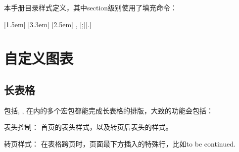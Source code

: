 本手册目录样式定义，其中section级别使用了填充命令：
\begin{latex}
[1.5em]{}{\contentslabel{1.5em}}
    {\hspace*{-2em}}{\hfill\contentspage}
[3.3em]{}
    {\contentslabel{1.8em}}{\hspace*{-2.3em}}
    {\titlerule*[8pt]{$\cdot$}\contentspage}
[2.5em]{\small}
    {\thecontentslabel{}}{}
    {, \thecontentspage}[;\qquad][.]
\end{latex}

\section{自定义图表}
\label{sec:figtab}
\subsection{长表格}
包括, , 在内的多个宏包都能完成长表格的排版，大致的功能会包括：
\begin{para}
\item[表头控制：] 首页的表头样式，以及转页后表头的样式。
\item[转页样式：] 在表格跨页时，页面最下方插入的特殊行，比如to be continued.
\end{para}

